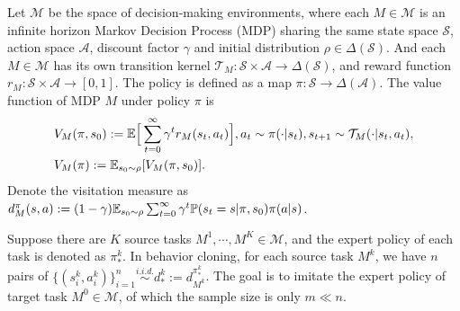 \documentclass[11pt]{article}
\numberwithin{equation}{section}
\renewcommand{\P}{\mathbb{P}}
\begin{document}
Let $\mathcal{M}$ be the space of decision-making environments, where each $M\in\mathcal{M}$ is an infinite horizon Markov Decision Process (MDP) sharing the same state space $\mathcal{S}$, action space $\mathcal{A}$, discount factor $\gamma$ and initial distribution $\rho\in\Delta(\mathcal{S})$.
And each $M\in\mathcal{M}$ has its own transition kernel $\mathcal{T}_M:\mathcal{S}\times\mathcal{A}\to\Delta(\mathcal{S})$, and reward function $r_M:\mathcal{S}\times\mathcal{A}\to[0,1]$.
The policy is defined as a map $\pi:\mathcal{S}\to\Delta(\mathcal{A})$. 
The value function of MDP $M$ under policy $\pi$ is 
\begin{equation}
    \begin{aligned}
        &V_M(\pi,s_0):= \mathbb{E}\Big[\sum_{t=0}^\infty \gamma^tr_M(s_t,a_t)\Big], a_t\sim\pi(\cdot|s_t),
        s_{t+1}\sim\mathcal{T}_M(\cdot|s_t,a_t),\\  
        &V_M(\pi):=\mathbb{E}_{s_0\sim\rho}[V_M(\pi,s_0)].
    \end{aligned}
\end{equation}
Denote the visitation measure as $d_M^\pi(s,a):=(1-\gamma)\E_{s_0\sim\rho}\sum_{t=0}^\infty \gamma^t\P(s_t=s|\pi,s_0)\pi(a|s)$.

Suppose there are $K$ source tasks $M^1,\cdots,M^K\in\mathcal{M}$, and the expert policy of each task is denoted as $\pi_*^k$.
In behavior cloning, for each source task $M^k$, we have $n$ pairs of $\{(s_i^k,a_i^k)\}_{i=1}^n \overset{\textit{i.i.d.}}{\sim} d^k_*:=d_{M^k}^{\pi_*^k}$. 
The goal is to imitate the expert policy of target task $M^0\in\mathcal{M}$, of which the sample size is only $m\ll n$.   
\end{document}
